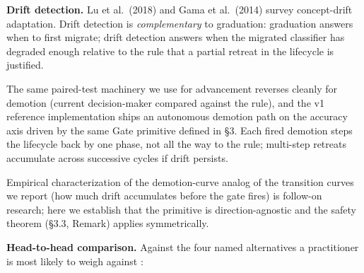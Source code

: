 \textbf{Drift detection.} Lu et al.~(2018) and Gama et al.~(2014) survey
concept-drift adaptation. Drift detection is \emph{complementary} to
graduation: graduation answers when to first migrate; drift detection
answers when the migrated classifier has degraded enough relative to the
rule that a partial retreat in the lifecycle is justified.

The same paired-test machinery we use for advancement reverses cleanly
for demotion (current decision-maker compared against the rule), and the
v1 reference implementation ships an autonomous demotion path on the
accuracy axis driven by the same Gate primitive defined in §3. Each
fired demotion steps the lifecycle back by one phase, not all the way to
the rule; multi-step retreats accumulate across successive cycles if
drift persists.

Empirical characterization of the demotion-curve analog of the
transition curves we report (how much drift accumulates before the gate
fires) is follow-on research; here we establish that the primitive is
direction-agnostic and the safety theorem (§3.3, Remark) applies
symmetrically.

\textbf{Head-to-head comparison.} Against the four named alternatives a
practitioner is most likely to weigh against \sysname{}:

